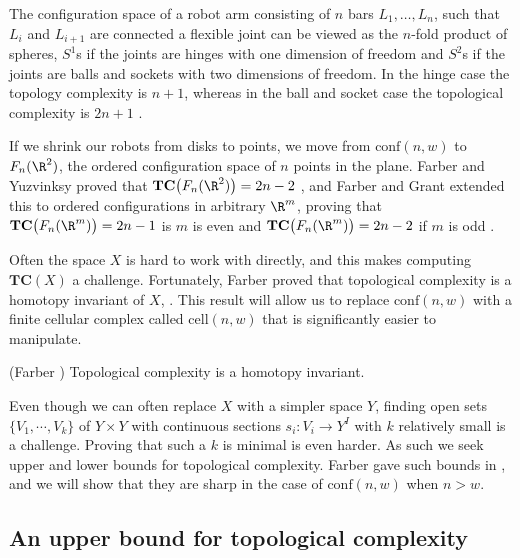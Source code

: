 \begin{exam}
The configuration space of a robot arm consisting of $n$ bars $L_{1}, \dots, L_{n}$, such that $L_{i}$ and $L_{i+1}$ are connected a flexible joint can be viewed as the $n$-fold product of spheres, $S^{1}$s if the joints are hinges with one dimension of freedom and $S^{2}$s if the joints are balls and sockets with two dimensions of freedom.
In the hinge case the topology complexity is $n+1$, whereas in the ball and socket case the topological complexity is $2n+1$ \cite[Theorem 12]{farber2003topological}.
\end{exam}

\begin{exam}
If we shrink our robots from disks to points, we move from $\text{conf}(n,w)$ to $F_{n}(\R^{2})$, the ordered configuration space of $n$ points in the plane.
Farber and Yuzvinksy proved that $\textbf{TC}\big(F_{n}(\R^{2})\big)=2n-2$ \cite[Theorem 1]{farber2002topological}, and Farber and Grant extended this to ordered configurations in arbitrary $\R^{m}$, proving that $\textbf{TC}\big(F_{n}(\R^{m})\big)=2n-1$ is $m$ is even and $\textbf{TC}\big(F_{n}(\R^{m})\big)=2n-2$ if $m$ is odd \cite[Theorem 1]{farber2009topological}.
\end{exam}

Often the space $X$ is hard to work with directly, and this makes computing $\textbf{TC}(X)$ a challenge.
Fortunately, Farber proved that topological complexity is a homotopy invariant of $X$, \cite[Theorem 3]{farber2003topological}.
This result will allow us to replace $\text{conf}(n,w)$ with a finite cellular complex called $\text{cell}(n,w)$ that is significantly easier to manipulate.

\begin{prop}\label{TC is homotopy invariant}
(Farber \cite[Theorem 3]{farber2003topological}) Topological complexity is a homotopy invariant.
\end{prop}

Even though we can often replace $X$ with a simpler space $Y$, finding open sets $\{V_{1}, \cdots, V_{k}\}$ of $Y\times Y$ with continuous sections $s_{i}:V_{i}\to Y^{I}$ with $k$ relatively small is a challenge.
Proving that such a $k$ is minimal is even harder.
As such we seek upper and lower bounds for topological complexity.
Farber gave such bounds in \cite[Sections 3 and 4]{farber2003topological}, and we will show that they are sharp in the case of $\text{conf}(n,w)$ when $n>w$.

\subsection{An upper bound for topological complexity}


